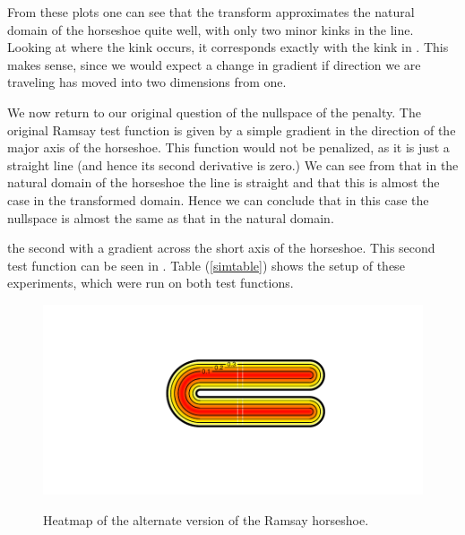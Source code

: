 From these plots one can see that the \sch transform approximates the natural domain of the horseshoe quite well, with only two minor kinks in the line. Looking at where the kink occurs, it corresponds exactly with the kink in . This makes sense, since we would expect a change in gradient if direction we are traveling has moved into two dimensions from one.

We now return to our original question of the nullspace of the penalty. The original Ramsay test function is given by a simple gradient in the direction of the major axis of the horseshoe. This function would not be penalized, as it is just a straight line (and hence its second derivative is zero.) We can see from  that in the natural domain of the horseshoe the line is straight and that this is almost the case in the transformed domain. Hence we can conclude that in this case the nullspace is almost the same as that in the natural domain.














 the second with a gradient across the short axis of the horseshoe. This second test function can be seen in . Table (\ref{simtable}) shows the setup of these experiments, which were run on both test functions.

\begin{figure}
\centering
\includegraphics[trim=0.5in 1in 0in 0.5in]{figs/altramsayhorseshoe.pdf} \\
\caption{Heatmap of the alternate version of the Ramsay horseshoe.}
\label{altramsayhorseshoe}
\end{figure}




